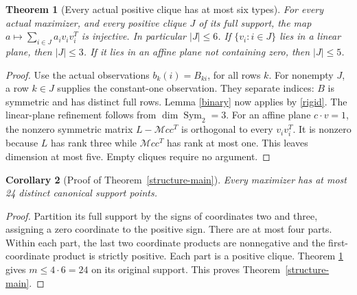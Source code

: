 \documentclass[11pt]{article}
\newtheorem{theorem}{Theorem}[section]
\newtheorem{corollary}[theorem]{Corollary}
\theoremstyle{remark}\newtheorem{remark}[theorem]{Remark}
\numberwithin{equation}{section}
\begin{document}
\begin{theorem}[Every actual positive clique has at most six types]\label{six}
For every actual maximizer, and every positive
clique $J$ of its full support, the map
$a\mapsto\sum_{i\in J}a_iv_iv_i^T$ is injective. In particular $|J|\le6$.
If $\{v_i:i\in J\}$ lies in a linear plane, then $|J|\le3$.
If it lies in an affine plane not containing zero, then $|J|\le5$.
\end{theorem}
\begin{proof}
Use the actual observations $b_k(i)=B_{ki}$, for all rows $k$.
For nonempty $J$, a row $k\in J$ supplies the constant-one observation.
They separate indices: $B$ is symmetric and has distinct full rows.
Lemma \ref{binary} now applies by \eqref{rigid}.
The linear-plane refinement follows from $\dim\operatorname{Sym}_2=3$.
For an affine plane $c\cdot v=1$, the nonzero symmetric matrix
$L-\mathcal M cc^T$ is orthogonal to every $v_iv_i^T$. It is nonzero because $L$
has rank three while $\mathcal M cc^T$ has rank at most one. This leaves dimension at most five.
Empty cliques require no argument.
\end{proof}

\begin{corollary}[Proof of Theorem~\ref{structure-main}]\label{twentyfour}
Every maximizer has at most 24 distinct canonical support points.
\end{corollary}
\begin{proof}
Partition its full support by the signs of coordinates two and three,
assigning a zero coordinate to the positive sign. There are at most four parts.
Within each part, the last two coordinate products are nonnegative and the
first-coordinate product is strictly positive. Each part is a positive clique.
Theorem \ref{six} gives $m\le4\cdot6=24$ on its original support. This proves Theorem~\ref{structure-main}.
\end{proof}
\end{document}
